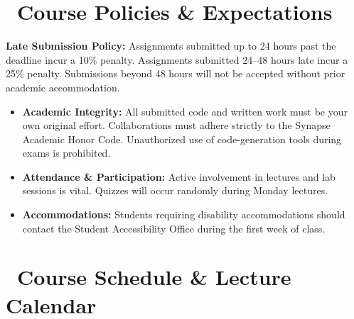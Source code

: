 \documentclass[11pt, a4paper]{article}
\begin{document}
\section*{\faExclamationTriangle\ Course Policies \& Expectations}
\begin{tcolorbox}[alertbox]
  \small
  \textbf{Late Submission Policy:} Assignments submitted up to 24 hours past the deadline incur a 10\% penalty. Assignments submitted 24--48 hours late incur a 25\% penalty. Submissions beyond 48 hours will not be accepted without prior academic accommodation.
\end{tcolorbox}

\begin{itemize}[label=\textcolor{TealSecondary}{\small\faCheckCircle}, leftmargin=1.5em]
  \item \textbf{Academic Integrity:} All submitted code and written work must be your own original effort. Collaborations must adhere strictly to the Synapse Academic Honor Code. Unauthorized use of code-generation tools during exams is prohibited.
  \item \textbf{Attendance \& Participation:} Active involvement in lectures and lab sessions is vital. Quizzes will occur randomly during Monday lectures.
  \item \textbf{Accommodations:} Students requiring disability accommodations should contact the Student Accessibility Office during the first week of class.
\end{itemize}

\vspace{1em}

\section*{\faCalendar\ Course Schedule \& Lecture Calendar}
\end{document}
